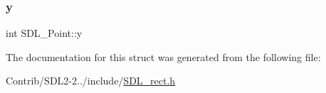 \mbox{\label{struct_s_d_l___point_aaa68aefa869f6bdf46367a70bd9414b0}} 
\subsubsection{\texorpdfstring{y}{y}}
{\footnotesize\ttfamily int S\+D\+L\+\_\+\+Point\+::y}



The documentation for this struct was generated from the following file\+:\begin{DoxyCompactItemize}
\item 
Contrib/\+S\+D\+L2-\/2../include/\mbox{\hyperlink{_s_d_l__rect_8h}{S\+D\+L\+\_\+rect.\+h}}\end{DoxyCompactItemize}
